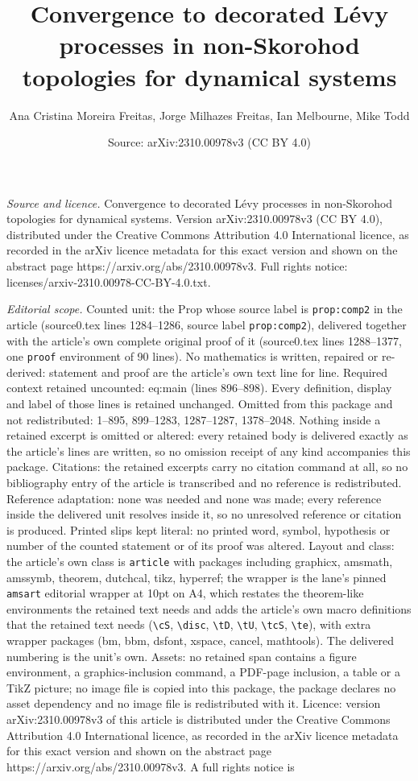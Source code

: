 \documentclass[10pt,a4paper]{amsart}
\title[Convergence to decorated L\'evy processes in non-Skorohod to]{Convergence to decorated L\'evy processes in non-Skorohod topologies for dynamical systems}
\author{Ana Cristina Moreira Freitas, Jorge Milhazes Freitas, Ian Melbourne, Mike Todd}
\date{Source: arXiv:2310.00978v3 (CC BY 4.0)}
\begin{document}
\maketitle

\noindent\emph{Source and licence.} Convergence to decorated L\'evy processes in non-Skorohod topologies for dynamical systems. Version arXiv:2310.00978v3 (CC BY 4.0), distributed under the Creative Commons Attribution 4.0 International licence, as recorded in the arXiv licence metadata for this exact version and shown on the abstract page https://arxiv.org/abs/2310.00978v3. Full rights notice: licenses/arxiv-2310.00978-CC-BY-4.0.txt.\par\smallskip

\noindent\textit{Editorial scope.} Counted unit: the Prop whose source label is \texttt{prop:comp2} in the article (source0.tex lines 1284--1286, source label \texttt{prop:comp2}), delivered together with the article's own complete original proof of it (source0.tex lines 1288--1377, one \texttt{proof} environment of 90 lines). No mathematics is written, repaired or re-derived: statement and proof are the article's own text line for line. Required context retained uncounted: eq:main (lines 896--898). Every definition, display and label of those lines is retained unchanged. Omitted from this package and not redistributed: 1--895, 899--1283, 1287--1287, 1378--2048. Nothing inside a retained excerpt is omitted or altered: every retained body is delivered exactly as the article's lines are written, so no omission receipt of any kind accompanies this package. Citations: the retained excerpts carry no citation command at all, so no bibliography entry of the article is transcribed and no reference is redistributed. Reference adaptation: none was needed and none was made; every reference inside the delivered unit resolves inside it, so no unresolved reference or citation is produced. Printed slips kept literal: no printed word, symbol, hypothesis or number of the counted statement or of its proof was altered. Layout and class: the article's own class is \texttt{article} with packages including graphicx, amsmath, amssymb, theorem, dutchcal, tikz, hyperref; the wrapper is the lane's pinned \texttt{amsart} editorial wrapper at 10pt on A4, which restates the theorem-like environments the retained text needs and adds the article's own macro definitions that the retained text needs (\texttt{\textbackslash cS}, \texttt{\textbackslash disc}, \texttt{\textbackslash tD}, \texttt{\textbackslash tU}, \texttt{\textbackslash tcS}, \texttt{\textbackslash te}), with extra wrapper packages (bm, bbm, dsfont, xspace, cancel, mathtools). The delivered numbering is the unit's own. Assets: no retained span contains a figure environment, a graphics-inclusion command, a PDF-page inclusion, a table or a TikZ picture; no image file is copied into this package, the package declares no asset dependency and no image file is redistributed with it. Licence: version arXiv:2310.00978v3 of this article is distributed under the Creative Commons Attribution 4.0 International licence, as recorded in the arXiv licence metadata for this exact version and shown on the abstract page https://arxiv.org/abs/2310.00978v3. A full rights notice is 
\end{document}
